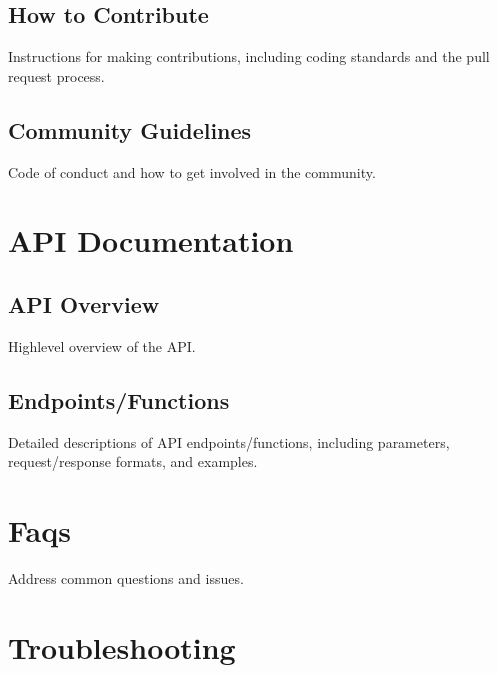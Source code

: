 \documentclass[letterpaper,10pt,english]{sphinxmanual}
\begin{document}
\section{How to Contribute}
\label{\detokenize{contribution_guidelines:how-to-contribute}}
\sphinxAtStartPar
Instructions for making contributions, including coding standards and the pull request process.


\section{Community Guidelines}
\label{\detokenize{contribution_guidelines:community-guidelines}}
\sphinxAtStartPar
Code of conduct and how to get involved in the community.

\sphinxstepscope


\chapter{API Documentation}
\label{\detokenize{api_documentation:api-documentation}}\label{\detokenize{api_documentation::doc}}

\section{API Overview}
\label{\detokenize{api_documentation:api-overview}}
\sphinxAtStartPar
High\sphinxhyphen{}level overview of the API.


\section{Endpoints/Functions}
\label{\detokenize{api_documentation:endpoints-functions}}
\sphinxAtStartPar
Detailed descriptions of API endpoints/functions, including parameters, request/response formats, and examples.

\sphinxstepscope


\chapter{Faqs}
\label{\detokenize{faqs:faqs}}\label{\detokenize{faqs::doc}}
\sphinxAtStartPar
Address common questions and issues.

\sphinxstepscope


\chapter{Troubleshooting}
\label{\detokenize{troubleshooting:troubleshooting}}\label{\detokenize{troubleshooting::doc}}
\end{document}
